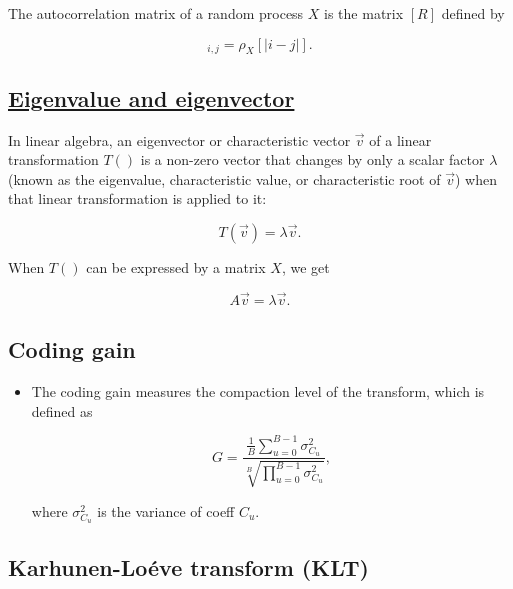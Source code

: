 The autocorrelation matrix of a random process \(X\) is the matrix
\([R]\) defined by

\begin{equation}
  [R]_{i,j} = \rho_X[|i-j|].
\end{equation}

    \hypertarget{eigenvalue-and-eigenvector}{%
\subsection{\texorpdfstring{\href{https://en.wikipedia.org/wiki/Eigenvalues_and_eigenvectors}{Eigenvalue
and
eigenvector}}{Eigenvalue and eigenvector}}\label{eigenvalue-and-eigenvector}}

In linear algebra, an eigenvector or characteristic vector
\(\overrightarrow{v}\) of a linear transformation \(T()\) is a non-zero
vector that changes by only a scalar factor \(\lambda\) (known as the
eigenvalue, characteristic value, or characteristic root of
\(\overrightarrow{v}\)) when that linear transformation is applied to
it:

\begin{equation}
  {\displaystyle T(\overrightarrow{v} )=\lambda \overrightarrow{v}}.
\end{equation}

When \(T()\) can be expressed by a matrix \(X\), we get

\begin{equation}
  A\overrightarrow{v} =\lambda \overrightarrow{v}.
\end{equation}

    \hypertarget{coding-gain}{%
\subsection{Coding gain}\label{coding-gain}}

\begin{itemize}
\item
  The coding gain measures the compaction level of the transform, which
  is defined as

  \begin{equation}
    G=\frac{\frac{1}{B}\displaystyle\sum_{u=0}^{B-1}\sigma_{C_u}^2}{\sqrt[B]{\displaystyle\prod_{u=0}^{B-1}\sigma_{C_u}^2}},
  \end{equation}

  where \(\sigma_{C_u}^2\) is the variance of coeff \(C_u\).
\end{itemize}

    \hypertarget{karhunen-louxe9ve-transform-klt}{%
\subsection{Karhunen-Loéve transform
(KLT)}\label{karhunen-louxe9ve-transform-klt}}

